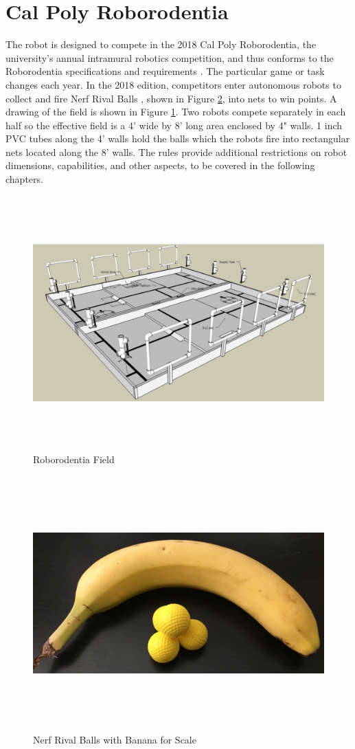 \section{Cal Poly Roborodentia}
The robot is designed to compete in the 2018 Cal Poly Roborodentia, the university's annual intramural robotics competition, and thus conforms to the Roborodentia specifications and requirements \cite{roborodentia}. The particular game or task changes each year. In the 2018 edition, competitors enter autonomous robots to collect and fire Nerf Rival Balls \cite{hasbro_2018}, shown in Figure \ref{fig:nerf_rival_balls}, into nets to win points. A drawing of the field is shown in Figure \ref{fig:roborodentia_field}. Two robots compete separately in each half so the effective field is a 4' wide by 8' long area enclosed by 4" walls. 1 inch PVC tubes along the 4' walls hold the balls which the robots fire into rectangular nets located along the 8' walls. The rules provide additional restrictions on robot dimensions, capabilities, and other aspects, to be covered in the following chapters.
\begin{figure}[H]   %
	\centering \includegraphics[width=6in, height=3.85in, keepaspectratio]{figures/roborodentia_field.png}
	\caption{Roborodentia Field \cite{roborodentia}}	\label{fig:roborodentia_field}
\end{figure}
\begin{figure}[H]   %
	\centering \includegraphics[width=6in, height=3.85in, keepaspectratio]{figures/nerf_rival_balls.jpg}
	\caption{Nerf Rival Balls with Banana for Scale}	\label{fig:nerf_rival_balls}
\end{figure}
